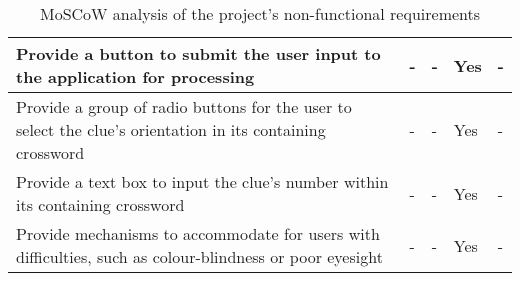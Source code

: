 \begin{table}[H]
\begin{tabular}{|p{9.3cm}|p{1.3cm}|p{1.3cm}|p{1.3cm}|p{1.3cm}|}
    Provide a button to submit the user input to the application for processing &
	- & - & Yes & - \\ \hline

	Provide a group of radio buttons for the user to select the clue's orientation in its containing crossword &
	- & - & Yes & - \\ \hline

    Provide a text box to input the clue's number within its containing crossword &
	- & - & Yes & - \\ \hline

	Provide mechanisms to accommodate for users with difficulties, such as colour-blindness or poor eyesight &
	- & - & Yes & - \\ \hline

    \end{tabular}
    \caption {MoSCoW analysis of the project's non-functional requirements}
\end{table}